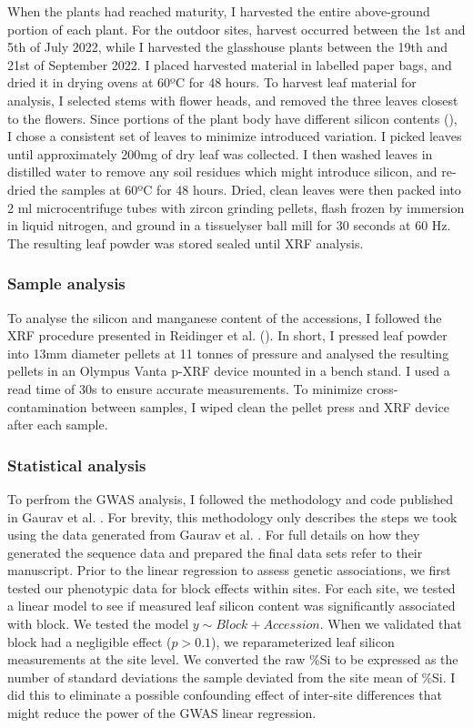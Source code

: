 \documentclass[12pt, letterpaper, ]{article}
\begin{document}
When the plants had reached maturity, I harvested the entire above-ground portion of each plant. For the outdoor sites, harvest occurred between the 1st and 5th of July 2022, while I harvested the glasshouse plants between the 19th and 21st of September 2022. I placed harvested material in labelled paper bags, and dried it in drying ovens at 60ºC for 48 hours. To harvest leaf material for analysis, I selected stems with flower heads, and removed the three leaves closest to the flowers. Since portions of the plant body have different silicon contents (\cite{dai_genetic_2005}), I chose a consistent set of leaves to minimize introduced variation. I picked leaves until approximately 200mg of dry leaf was collected. I then washed leaves in distilled water to remove any soil residues which might introduce silicon, and re-dried the samples at 60ºC for 48 hours. Dried, clean leaves were then packed into 2 ml microcentrifuge tubes with zircon grinding pellets, flash frozen by immersion in liquid nitrogen, and ground in a tissuelyser ball mill for 30 seconds at 60 Hz. The resulting leaf powder was stored sealed until XRF analysis. 

\subsubsection{Sample analysis}

To analyse the silicon and manganese content of the accessions, I followed the XRF procedure presented in Reidinger et al. (). In short, I pressed leaf powder into 13mm diameter pellets at 11 tonnes of pressure and analysed the resulting pellets in an Olympus Vanta p-XRF device mounted in a bench stand. I used a read time of 30s to ensure accurate measurements. To minimize cross-contamination between samples, I wiped clean the pellet press and XRF device after each sample.

\subsubsection{Statistical analysis}

To perfrom the GWAS analysis, I followed the methodology and code published in Gaurav et al. . For brevity, this methodology only describes the steps we took using the data generated from Gaurav et al. . For full details on how they generated the sequence data and prepared the final data sets refer to their manuscript. Prior to the linear regression to assess genetic associations, we first tested our phenotypic data for block effects within sites. For each site, we tested a linear model to see if measured leaf silicon content was significantly associated with block. We tested the model $y \sim Block + Accession$. When we validated that block had a negligible effect ($p>0.1$), we reparameterized leaf silicon measurements at the site level. We converted the raw \%Si to be expressed as the number of standard deviations the sample deviated from the site mean of \%Si. I did this to eliminate a possible confounding effect of inter-site differences that might reduce the power of the GWAS linear regression. 
\end{document}

